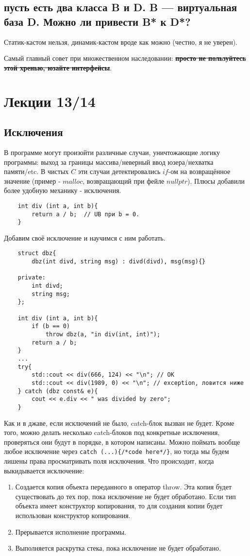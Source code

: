 \documentclass[15pt, a4paper]{article}
\newcommand{\nl}{\newline}
\begin{document}
\subsection{пусть есть два класса B и D. B — виртуальная база D. Можно ли привести B* к D*?}
Статик-кастом нельзя, динамик-кастом вроде как можно (честно, я не уверен). \nl

Самый главный совет при множественном наследовании: \textbf{\sout{просто не пользуйтесь этой хренью, юзайте интерфейсы}}. \newpage

\section{Лекции 13/14}
\subsection{Исключения}
В программе могут произойти различные случаи, уничтожающие логику программы: выход за границы массива/неверный ввод юзера/нехватка памяти/etc.
В чистых $C$ эти случаи детектировались $if$-ом на возвращённое значение (пример - $malloc$, возвращающий при фейле $nullptr$). Плюсы добавили более удобную механику - исключения.
\begin{verbatim}
    int div (int a, int b){
        return a / b;  // UB при b = 0.
    }
\end{verbatim}
Добавим своё исключение и научимся с ним работать.
\begin{verbatim}
    struct dbz{
        dbz(int divd, string msg) : divd(divd), msg(msg){}
    
    private:
        int divd;
        string msg;
    };

    int div (int a, int b){
        if (b == 0)
            throw dbz(a, "in div(int, int)");
        return a / b;
    }
    ...
    try{
        std::cout << div(666, 124) << "\n"; // OK
        std::cout << div(1989, 0) << "\n"; // exception, ловится ниже
    } catch (dbz const& e){
        cout << e.div << " was divided by zero";
    }
\end{verbatim}
Как и в джаве, если исключений не было, catch-блок вызван не будет. Кроме того, можно делать несколько catch-блоков под конкретные исключения, проверяться они будут в порядке, в котором написаны.
Можно поймать вообще любое исключение через \texttt{catch (...)\{/*code here*/\}}, но тогда мы будем лишены права просматривать поля исключения.
Что происходит, когда выкидывается исключение:
\begin{enumerate}
    \item Создается копия объекта переданного в оператор throw. Эта копия будет существовать до тех пор, пока исключение не будет обработано. Если тип объекта имеет конструктор копирования, то для создания копии будет использован конструктор копирования.
    \item Прерывается исполнение программы.
    \item Выполняется раскрутка стека, пока исключение не будет обработано.
\end{enumerate}
\end{document}
